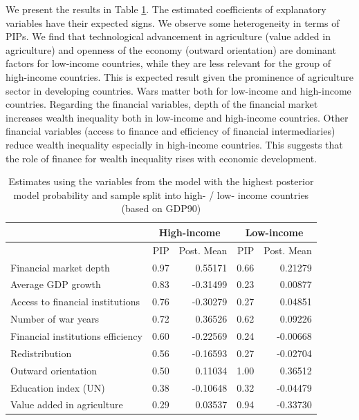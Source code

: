 \documentclass[a4paper,11pt]{article}
\begin{document}
We present the results in Table \ref{tab:inc_comparison}. The estimated coefficients of explanatory variables have their expected signs. We observe some heterogeneity in terms of PIPs. We find that technological advancement in agriculture (value added in agriculture) and openness of the economy (outward orientation) are dominant factors for low-income countries, while they are less relevant for the group of high-income countries. This is expected result given the prominence of agriculture sector in developing countries. Wars matter both for low-income and high-income countries. Regarding the financial variables, depth of the financial market increases wealth inequality both in low-income and high-income countries. Other financial variables (access to finance and efficiency of financial intermediaries) reduce wealth inequality especially in high-income countries. This suggests that the role of finance for wealth inequality rises with economic development.  

\begin{table}[htbp!]
\caption{Estimates using the variables from the model with the highest posterior model probability and sample split into high- / low- income countries (based on GDP90)}
\label{tab:inc_comparison}
\centering
\begin{tabular}{lrrrr}
  \toprule
  & \multicolumn{2}{c}{High-income} & \multicolumn{2}{c}{Low-income} \\
  \midrule
	 & PIP & Post. Mean & PIP & Post. Mean \\ 
  \midrule
  Financial market depth & 0.97 & 0.55171 & 0.66 & 0.21279 \\ 
  Average GDP growth & 0.83 & -0.31499 & 0.23 & 0.00877 \\ 
  Access to financial institutions & 0.76 & -0.30279 & 0.27 & 0.04851 \\ 
  Number of war years & 0.72 & 0.36526 & 0.62 & 0.09226 \\ 
  Financial institutions efficiency & 0.60 & -0.22569 & 0.24 & -0.00668 \\ 
  Redistribution & 0.56 & -0.16593 & 0.27 & -0.02704 \\ 
  Outward orientation & 0.50 & 0.11034 & 1.00 & 0.36512 \\ 
  Education index (UN) & 0.38 & -0.10648 & 0.32 & -0.04479 \\ 
  Value added in agriculture & 0.29 & 0.03537 & 0.94 & -0.33730 \\ 
   \bottomrule
\end{tabular}
\end{table}
\end{document}
